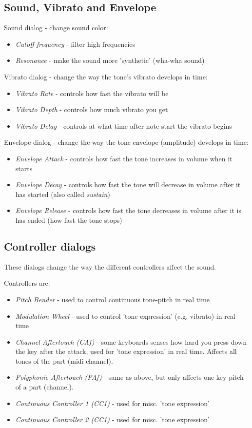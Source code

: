 \documentclass[letterpaper]{report}
\begin{document}
\subsection{Sound, Vibrato and Envelope}

Sound dialog - change sound color:

\begin{itemize}
\item {\em Cutoff frequency} - filter high frequencies
\item {\em Resonance} - make the sound more 'synthetic' (wha-wha sound)
\end{itemize}

Vibrato dialog - change the way the tone's vibrato develops in time:

\begin{itemize}
\item {\em Vibrato Rate} - controls how fast the vibrato will be
\item {\em Vibrato Depth} - controls how much vibrato you get
\item {\em Vibrato Delay} - controls at what time after note start the
vibrato begins
\end{itemize}

Envelope dialog - change the way the tone envelope (amplitude) develops in
time:

\begin{itemize}
\item {\em Envelope Attack} - controls how fast the tone increases in volume
when it starts
\item {\em Envelope Decay} - controls how fast the tone will
decrease in volume after it has started (also called {\em sustain})
\item {\em Envelope Release} - controls how fast the tone decreases in volume
after it is has ended (how fast the tone stops)
\end{itemize}

\subsection{Controller dialogs}
These dialogs change the way the different controllers affect the sound.

Controllers are:

\begin{itemize}
\item {\em Pitch Bender} - used to control continuous tone-pitch in real time
\item {\em Modulation Wheel} - used to control 'tone expression'
(e.g. vibrato) in real time
\item {\em Channel Aftertouch (CAf)} - some keyboards senses how hard you
press down the key after the attack, used for 'tone expression' in real
time. Affects all tones of the part (midi channel).
\item {\em Polyphonic Aftertouch (PAf)} - same as above, but only affects
one key pitch of a part (channel).
\item {\em Continuous Controller 1 (CC1)} - used for misc. 'tone expression'
\item {\em Continuous Controller 2 (CC1)} - used for misc. 'tone expression'
\end{itemize}
\end{document}
